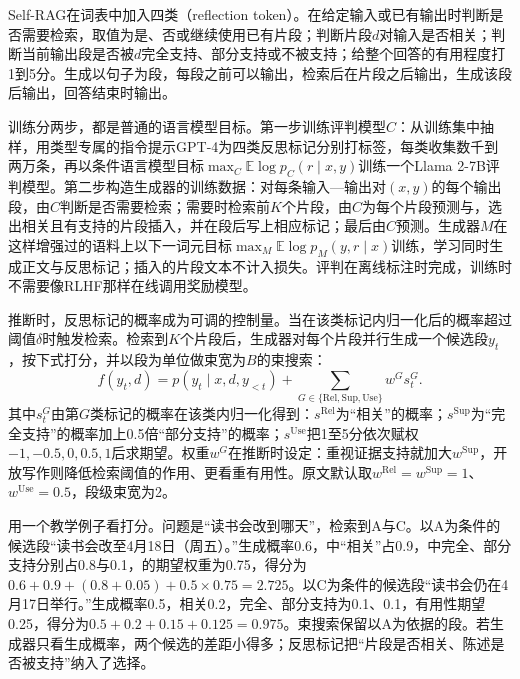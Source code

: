 Self-RAG在词表中加入四类（reflection token）。在给定输入或已有输出时判断是否需要检索，取值为是、否或继续使用已有片段；判断片段$d$对输入是否相关；判断当前输出段是否被$d$完全支持、部分支持或不被支持；给整个回答的有用程度打1到5分。生成以句子为段，每段之前可以输出，检索后在片段之后输出，生成该段后输出，回答结束时输出。

训练分两步，都是普通的语言模型目标。第一步训练评判模型$C$：从训练集中抽样，用类型专属的指令提示GPT-4为四类反思标记分别打标签，每类收集数千到两万条，再以条件语言模型目标$\max_C\mathbb E\log p_C(r\mid x,y)$训练一个Llama 2-7B评判模型。第二步构造生成器的训练数据：对每条输入—输出对$(x,y)$的每个输出段，由$C$判断是否需要检索；需要时检索前$K$个片段，由$C$为每个片段预测与，选出相关且有支持的片段插入，并在段后写上相应标记；最后由$C$预测。生成器$M$在这样增强过的语料上以下一词元目标$\max_M\mathbb E\log p_M(y,r\mid x)$训练，学习同时生成正文与反思标记；插入的片段文本不计入损失。评判在离线标注时完成，训练时不需要像RLHF那样在线调用奖励模型。

推断时，反思标记的概率成为可调的控制量。当在该类标记内归一化后的概率超过阈值$\delta$时触发检索。检索到$K$个片段后，生成器对每个片段并行生成一个候选段$y_t$，按下式打分，并以段为单位做束宽为$B$的束搜索：
\begin{equation}
  f(y_t,d)=p(y_t\mid x,d,y_{<t})+\sum_{G\in\{\mathrm{Rel},\mathrm{Sup},\mathrm{Use}\}}w^{G}s_t^{G}.
  \label{eq:nlp-dialogue-selfrag}
\end{equation}
其中$s_t^{G}$由第$G$类标记的概率在该类内归一化得到：$s^{\mathrm{Rel}}$为“相关”的概率；$s^{\mathrm{Sup}}$为“完全支持”的概率加上0.5倍“部分支持”的概率；$s^{\mathrm{Use}}$把1至5分依次赋权$-1,-0.5,0,0.5,1$后求期望。权重$w^{G}$在推断时设定：重视证据支持就加大$w^{\mathrm{Sup}}$，开放写作则降低检索阈值的作用、更看重有用性。原文默认取$w^{\mathrm{Rel}}=w^{\mathrm{Sup}}=1$、$w^{\mathrm{Use}}=0.5$，段级束宽为2。

用一个教学例子看打分。问题是“读书会改到哪天”，检索到A与C。以A为条件的候选段“读书会改至4月18日（周五）。”生成概率0.6，中“相关”占0.9，中完全、部分支持分别占0.8与0.1，的期望权重为0.75，得分为$0.6+0.9+(0.8+0.05)+0.5\times0.75=2.725$。以C为条件的候选段“读书会仍在4月17日举行。”生成概率0.5，相关0.2，完全、部分支持为0.1、0.1，有用性期望0.25，得分为$0.5+0.2+0.15+0.125=0.975$。束搜索保留以A为依据的段。若生成器只看生成概率，两个候选的差距小得多；反思标记把“片段是否相关、陈述是否被支持”纳入了选择。

